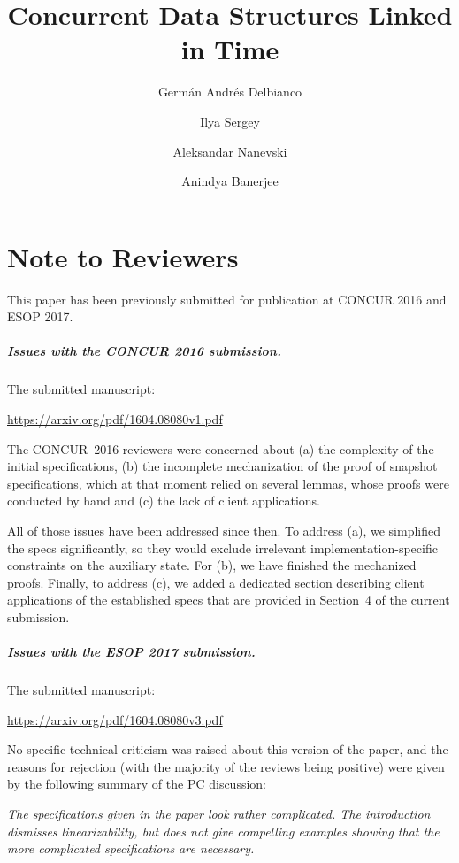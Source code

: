 \documentclass[a4paper,USenglish]{lipics-v2016}
\title{Concurrent Data Structures Linked in Time}
\author{Germ\'{a}n Andr\'{e}s Delbianco}
\author{Ilya Sergey}
\author{Aleksandar Nanevski}
\author{Anindya Banerjee}
\begin{document}
\maketitle
 
\thispagestyle{empty}


\section*{\LARGE{Note to Reviewers}}
\label{sec:note-reviewers}

This paper has been previously submitted for publication at CONCUR
2016 and ESOP 2017.

\subparagraph{Issues with the CONCUR 2016 submission.}

The submitted manuscript: 

\begin{center}
  \url{https://arxiv.org/pdf/1604.08080v1.pdf}
\end{center}

\noindent
%
The CONCUR~2016 reviewers were concerned about (a) the complexity of
the initial specifications, (b) the incomplete mechanization of the
proof of snapshot specifications, which at that moment relied on
several lemmas, whose proofs were conducted by hand and (c) the lack
of client applications.

All of those issues have been addressed since then. To address (a), we
simplified the specs significantly, so they would exclude irrelevant
implementation-specific constraints on the auxiliary state. For (b),
we have finished the mechanized proofs. Finally, to address (c), we
added a dedicated section describing client applications of the
established specs that are provided in Section~4 of the current
submission.

\subparagraph{Issues with the ESOP 2017 submission.}

The submitted manuscript: 

\begin{center}
  \url{https://arxiv.org/pdf/1604.08080v3.pdf}
\end{center}

\noindent
%
No specific technical criticism was raised about this version of the
paper, and the reasons for rejection (with the majority of the reviews
being positive) were given by the following summary of the PC
discussion:

\vspace{10pt}

\emph{The specifications given in the paper look rather complicated.
  The introduction dismisses linearizability, but does not give
  compelling examples showing that the more complicated specifications
  are necessary.}
\end{document}
